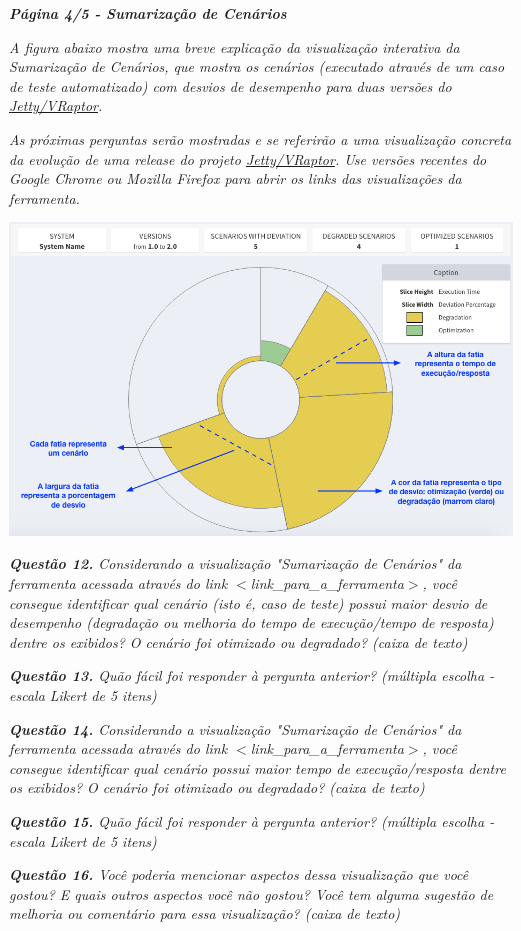 \begin{framed}
	\noindent \textit{\textbf{Página 4/5 - Sumarização de Cenários}}
	\par
	\noindent \textit{A figura abaixo mostra uma breve explicação da visualização interativa da Sumarização de Cenários, que mostra os cenários (executado através de um caso de teste automatizado) com desvios de desempenho para duas versões do \underline{Jetty/VRaptor}.}

	\noindent \textit{As próximas perguntas serão mostradas e se referirão a uma visualização concreta da evolução de uma release do projeto \underline{Jetty/VRaptor}. Use versões recentes do Google Chrome ou Mozilla Firefox para abrir os links das visualizações da ferramenta.}
	
   \includegraphics[scale=0.42]{Imagens/scenario_summarization_explicative_portuguese.png}

	\noindent \textit{\textbf{Questão 12.} Considerando a visualização "Sumarização de Cenários" da ferramenta acessada através do link {\(<\)}link\_para\_a\_ferramenta{\(>\)}, você consegue identificar qual cenário (isto é, caso de teste) possui maior desvio de desempenho (degradação ou melhoria do tempo de execução/tempo de resposta) dentre os exibidos? O cenário foi otimizado ou degradado? (caixa de texto)}
	\par
	\noindent \textit{\textbf{Questão 13.} Quão fácil foi responder à pergunta anterior? (múltipla escolha - escala Likert de 5 itens)}
	\par
	\noindent \textit{\textbf{Questão 14.} Considerando a visualização "Sumarização de Cenários" da ferramenta acessada através do link {\(<\)}link\_para\_a\_ferramenta{\(>\)}, você consegue identificar qual cenário possui maior tempo de execução/resposta dentre os exibidos? O cenário foi otimizado ou degradado? (caixa de texto)}
	\par
	\noindent \textit{\textbf{Questão 15.} Quão fácil foi responder à pergunta anterior? (múltipla escolha - escala Likert de 5 itens)}
	\par
	\noindent \textit{\textbf{Questão 16.} Você poderia mencionar aspectos dessa visualização que você gostou? E quais outros aspectos você não gostou? Você tem alguma sugestão de melhoria ou comentário para essa visualização? (caixa de texto)}
\end{framed}

